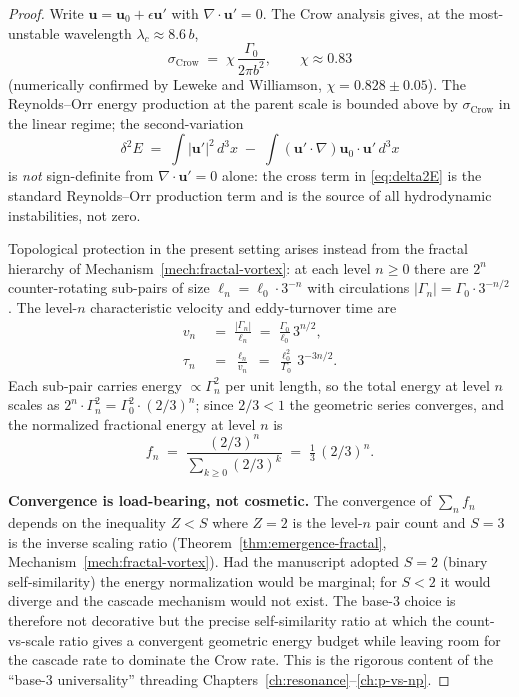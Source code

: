 \begin{proof}
Write $\mathbf{u} = \mathbf{u}_0 + \epsilon \mathbf{u}'$ with $\nabla \cdot \mathbf{u}' = 0$. The Crow analysis\cite{crow1970stability} gives, at the most-unstable wavelength $\lambda_c \approx 8.6\,b$,
\begin{equation}\label{eq:sigma-crow}
\sigma_{\mathrm{Crow}} \;=\; \chi\,\frac{\Gamma_0}{2\pi b^2}, \qquad \chi \approx 0.83
\end{equation}
(numerically confirmed by Leweke and Williamson\cite{leweke1998cooperative}, $\chi = 0.828 \pm 0.05$). The Reynolds--Orr energy production at the parent scale is bounded above by $\sigma_{\mathrm{Crow}}$ in the linear regime; the second-variation
\begin{equation}\label{eq:delta2E}
\delta^2 E \;=\; \int |\mathbf{u}'|^2 \, d^3x \;-\; \int (\mathbf{u}' \cdot \nabla)\mathbf{u}_0 \cdot \mathbf{u}' \, d^3x
\end{equation}
is \emph{not} sign-definite from $\nabla \cdot \mathbf{u}' = 0$ alone: the cross term in \eqref{eq:delta2E} is the standard Reynolds--Orr production term \cite{joseph1976stability,drazin2004hydrodynamic} and is the source of all hydrodynamic instabilities, not zero.

Topological protection in the present setting arises instead from the fractal hierarchy of Mechanism~\ref{mech:fractal-vortex}: at each level $n \ge 0$ there are $2^n$ counter-rotating sub-pairs of size $\ell_n = \ell_0 \cdot 3^{-n}$ with circulations $|\Gamma_n| = \Gamma_0 \cdot 3^{-n/2}$. The level-$n$ characteristic velocity and eddy-turnover time are
\begin{align}
v_n &\;=\; \frac{|\Gamma_n|}{\ell_n} \;=\; \frac{\Gamma_0}{\ell_0}\,3^{n/2}, \\
\tau_n &\;=\; \frac{\ell_n}{v_n} \;=\; \frac{\ell_0^2}{\Gamma_0}\,3^{-3n/2}.\label{eq:tau-n}
\end{align}
Each sub-pair carries energy $\propto \Gamma_n^2$ per unit length, so the total energy at level $n$ scales as $2^n \cdot \Gamma_n^2 = \Gamma_0^2 \cdot (2/3)^n$; since $2/3 < 1$ the geometric series converges, and the normalized fractional energy at level $n$ is
\begin{equation}\label{eq:f-n}
f_n \;=\; \frac{(2/3)^n}{\sum_{k\ge 0}(2/3)^k} \;=\; \tfrac{1}{3}\,(2/3)^n.
\end{equation}

\noindent\textbf{Convergence is load-bearing, not cosmetic.} The convergence of $\sum_n f_n$ depends on the inequality $Z < S$ where $Z = 2$ is the level-$n$ pair count and $S = 3$ is the inverse scaling ratio (Theorem~\ref{thm:emergence-fractal}, Mechanism~\ref{mech:fractal-vortex}). Had the manuscript adopted $S = 2$ (binary self-similarity) the energy normalization would be marginal; for $S < 2$ it would diverge and the cascade mechanism would not exist. The base-$3$ choice is therefore not decorative but the precise self-similarity ratio at which the count-vs-scale ratio gives a convergent geometric energy budget while leaving room for the cascade rate to dominate the Crow rate. This is the rigorous content of the ``base-$3$ universality'' threading Chapters~\ref{ch:resonance}--\ref{ch:p-vs-np}.


\end{proof}
